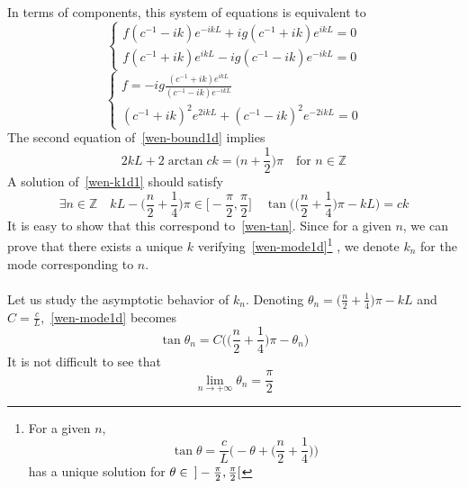 In terms of components, this system of equations is equivalent to
\begin{equation*}
\begin{cases}
f(c^{-1} - ik)e^{-ikL} + ig(c^{-1} + ik)e^{ikL} = 0 \\
f(c^{-1} + ik)e^{ikL} - ig(c^{-1}- ik) e^{-ikL} = 0
\end{cases}
\end{equation*}
\ie
\begin{equation}\label{wen-bound1d}
\begin{cases}
f = -ig \frac{(c^{-1} + ik)e^{ikL}}{(c^{-1} - ik) e^{-ikL}} \\
%
(c^{-1} + ik)^2 e^{2ikL} + (c^{-1}-ik)^2 e^{-2ikL} = 0
\end{cases}
\end{equation}
The second equation of~\cref{wen-bound1d} implies
\begin{equation}\label{wen-k1d1}
2kL + 2\arctan{ck} = \big( n +\frac 1 2 \big) \pi \quad\textrm{for $n \in \mathbb Z$}
\end{equation}
A solution of~\cref{wen-k1d1} should satisfy
\begin{equation}\label{wen-mode1d}
\exists n\in \mathbb{Z}\quad
kL - \big(\frac{n}{2} + \frac 1 4 \big) \pi \in \big[-\frac{\pi}{2}, \frac{\pi}{2}\big] \quad
\tan\Big( \big(\frac{n}{2}+\frac 1 4 \big)\pi -kL \Big) = ck
\end{equation}
It is easy to show that this correspond to~\cref{wen-tan}.
Since for a given $n$, we can prove that there exists a unique $k$ verifying~\cref{wen-mode1d}\footnote{
For a given $n$, 
\begin{equation*}
\tan \theta = \frac c L \Big( -\theta + \big( \frac n 2 + \frac 1 4 \big)\Big)
\end{equation*}
has a unique solution for $\theta \in \enskip] -\frac{\pi}{2}, \frac{\pi}{2}[$
}
, we denote $k_n$ for the mode corresponding to $n$. \\\\
Let us study the asymptotic behavior of $k_n$. 
Denoting $\theta_n = \big( \frac n 2 + \frac 1 4 \big)\pi - kL$ and $C = \frac c L$,~\cref{wen-mode1d} becomes
\begin{equation}\label{wen-modetheta}
\tan \theta_n = C \Big( \big(\frac n 2 +\frac 1 4 \big)\pi - \theta_n \Big)
\end{equation} 
It is not difficult to see that 
\begin{equation*}
\lim_{n\rightarrow+\infty}\theta_n = \frac \pi 2
\end{equation*}
